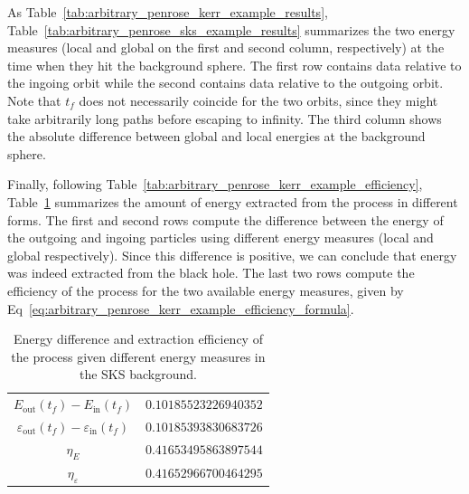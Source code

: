 As Table~\ref{tab:arbitrary_penrose_kerr_example_results}, Table~\ref{tab:arbitrary_penrose_sks_example_results} summarizes the two energy measures (local and global on the first and second column, respectively) at the time when they hit the background sphere. The first row contains data relative to the ingoing orbit while the second contains data relative to the outgoing orbit. Note that $t_f$ does not necessarily coincide for the two orbits, since they might take arbitrarily long paths before escaping to infinity. The third column shows the absolute difference between global and local energies at the background sphere.
%
\begin{table}[]
  \centering
  \caption{Energy measures at the time of collision with the background sphere in the \ac{SKS} background. The first row corresponds to the ingoing particle, the second to the outgoing particle.}
  \label{tab:arbitrary_penrose_sks_example_results}
\end{table}

Finally, following Table~\ref{tab:arbitrary_penrose_kerr_example_efficiency}, Table~\ref{tab:arbitrary_penrose_sks_example_efficiency} summarizes the amount of energy extracted from the process in different forms. The first and second rows compute the difference between the energy of the outgoing and ingoing particles using different energy measures (local and global respectively). Since this difference is positive, we can conclude that energy was indeed extracted from the black hole. The last two rows compute the efficiency of the process for the two available energy measures, given by Eq~\eqref{eq:arbitrary_penrose_kerr_example_efficiency_formula}.
\begin{table}[]
  \centering
  \begin{tabular}{cc}
    \hline\hline
    $E_\text{out}(t_f)-E_\text{in}(t_f)$                     & $0.10185523226940352$ \\
    $\varepsilon_\text{out}(t_f)-\varepsilon_\text{in}(t_f)$ & $0.10185393830683726$ \\
    $\eta_E$                                                 & $0.41653495863897544$ \\
    $\eta_\varepsilon$                                       & $0.41652966700464295$ \\ \hline\hline
  \end{tabular}
  \caption{Energy difference and extraction efficiency of the process given different energy measures in the \ac{SKS} background.}
  \label{tab:arbitrary_penrose_sks_example_efficiency}
\end{table}

